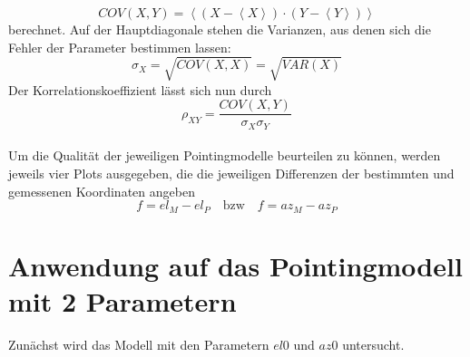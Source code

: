 \begin{equation}
COV(X,Y)=\left<\left(X-\left<X\right>\right)\cdot\left(Y-\left<Y\right>\right)\right>
\end{equation}
berechnet. Auf der Hauptdiagonale stehen die Varianzen, aus denen sich die Fehler der Parameter bestimmen lassen:
\begin{equation}
\sigma_X=\sqrt{COV(X,X)}=\sqrt{VAR(X)}
\end{equation}
Der Korrelationskoeffizient lässt sich nun durch
\begin{equation}
\rho_{XY}=\frac{COV(X,Y)}{\sigma_X\sigma_Y}
\end{equation}\\
Um die Qualität der jeweiligen Pointingmodelle beurteilen zu können, werden jeweils vier Plots ausgegeben, die die jeweiligen Differenzen der bestimmten und gemessenen Koordinaten angeben
\begin{equation}
f=el_M-el_P \quad \textrm{bzw} \quad f=az_M-az_P
\end{equation}
\section{Anwendung auf das Pointingmodell mit 2 Parametern}
Zunächst wird das Modell mit den Parametern $el0$ und $az0$ untersucht.
